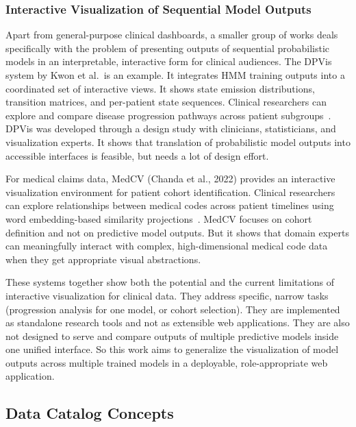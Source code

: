 \subsubsection{Interactive Visualization of Sequential Model Outputs}
\label{subsec:interactive_viz_outputs}

Apart from general-purpose clinical dashboards, a smaller group of works deals specifically with the problem of presenting outputs of sequential probabilistic models in an interpretable, interactive form for clinical audiences. The DPVis system by Kwon et al.\ is an example. It integrates HMM training outputs into a coordinated set of interactive views. It shows state emission distributions, transition matrices, and per-patient state sequences. Clinical researchers can explore and compare disease progression pathways across patient subgroups~\cite{kwon2020dpvis}. DPVis was developed through a design study with clinicians, statisticians, and visualization experts. It shows that translation of probabilistic model outputs into accessible interfaces is feasible, but needs a lot of design effort.

For medical claims data, MedCV (Chanda et al., 2022) provides an interactive visualization environment for patient cohort identification. Clinical researchers can explore relationships between medical codes across patient timelines using word embedding-based similarity projections~\cite{chanda2022medcv}. MedCV focuses on cohort definition and not on predictive model outputs. But it shows that domain experts can meaningfully interact with complex, high-dimensional medical code data when they get appropriate visual abstractions.

These systems together show both the potential and the current limitations of interactive visualization for clinical data. They address specific, narrow tasks (progression analysis for one model, or cohort selection). They are implemented as standalone research tools and not as extensible web applications. They are also not designed to serve and compare outputs of multiple predictive models inside one unified interface. So this work aims to generalize the visualization of model outputs across multiple trained models in a deployable, role-appropriate web application.

\subsection{Data Catalog Concepts}
\label{sec:data_catalogs}

